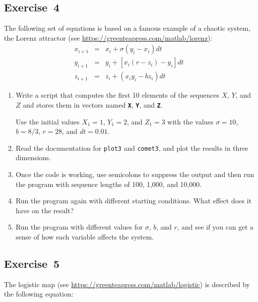 \subsection{Exercise~4}
  The following set of equations is based on a famous example of a chaotic system, the Lorenz attractor (see \url{https://greenteapress.com/matlab/lorenz}):
%
\begin{eqnarray*}
x_{i+1} &=& x_i + \sigma \left( y_i - x_i \right) dt  \\
y_{i+1} &=& y_i + \left[ x_i (r - z_i) - y_i \right] dt   \\
z_{i+1} &=& z_i + \left( x_i y_i - b z_i \right) dt
\end{eqnarray*}
%
\begin{enumerate}

\item Write a script that computes the first 10 elements of the sequences
$X$, $Y$, and $Z$ and stores them in vectors named \textbf{\lstinline{X}}, \textbf{\lstinline{Y}},
and \textbf{\lstinline{Z}}.

Use the initial values $X_1 = 1$, $Y_1 = 2$, and $Z_1 = 3$ with the values
$\sigma = 10$, $b = 8/3$, $r = 28$, and $dt = 0.01$.

\item Read the documentation for \lstinline{plot3} and \lstinline{comet3}, and
plot the results in three dimensions.

\item Once the code is working, use semicolons to suppress the output
and then run the program with sequence lengths of 100, 1,000, and 10,000.

\item Run the program again with different starting conditions.
What effect does it have on the result?

\item Run the program with different values for $\sigma$, $b$, and $r$,
and see if you can get a sense of how each variable affects the
system.

\end{enumerate}




\subsection{Exercise~5}
The logistic map (see \url{https://greenteapress.com/matlab/logistic}) is described by the following equation:

